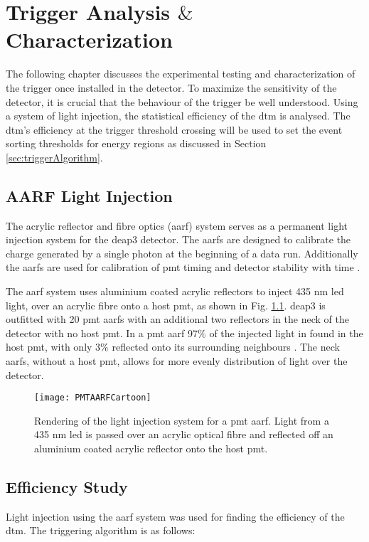 \chapter{Trigger Analysis $\&$ Characterization}
\label{chap:trigStudy}

The following chapter discusses the experimental testing and characterization of the trigger once installed in the detector. To maximize the sensitivity of the detector, it is crucial that the behaviour of the trigger be well understood. Using a system of light injection, the statistical efficiency of the \gls{dtm} is analysed. The \gls{dtm}'s efficiency at the trigger threshold crossing will be used to set the event sorting thresholds for energy regions as discussed in Section \ref{sec:triggerAlgorithm}.
\section{AARF Light Injection}
\label{sec:aarfs}
The acrylic reflector and fibre optics (\gls{aarf}) system serves as a permanent light injection system for the \gls{deap3} detector. The \gls{aarf}s are designed to calibrate the charge generated by a single photon at the beginning of a data run. Additionally the \gls{aarf}s are used for calibration of \gls{pmt} timing and detector stability with time \cite{alaisterThesis}.

The \gls{aarf} system uses aluminium coated acrylic reflectors to inject 435 nm \gls{led} light, over an acrylic fibre onto a host \gls{pmt}, as shown in Fig. \ref{Fig:AARFImage}. \gls{deap3} is outfitted with 20 \gls{pmt} \gls{aarf}s with an additional two reflectors in the neck of the detector with no host \gls{pmt}. In a \gls{pmt} \gls{aarf} 97$\%$ of the injected light in found in the host \gls{pmt}, with only $3\%$ reflected onto its surrounding neighbours \cite{alaisterThesis}. The neck \gls{aarf}s, without a host \gls{pmt}, allows for more evenly distribution of light over the detector.


 \begin{figure}
 \centering
 \texttt{[image: PMTAARFCartoon]}
 \caption{Rendering of the light injection system for a \gls{pmt} \gls{aarf}. Light from a 435 nm \gls{led} is passed over an acrylic optical fibre and reflected off an aluminium coated acrylic reflector onto the host \gls{pmt}.}
 \label{Fig:AARFImage}
 \end{figure}
 
\section{Efficiency Study}
Light injection using the \gls{aarf} system was used for finding the efficiency of the \gls{dtm}. The triggering algorithm is as follows:

